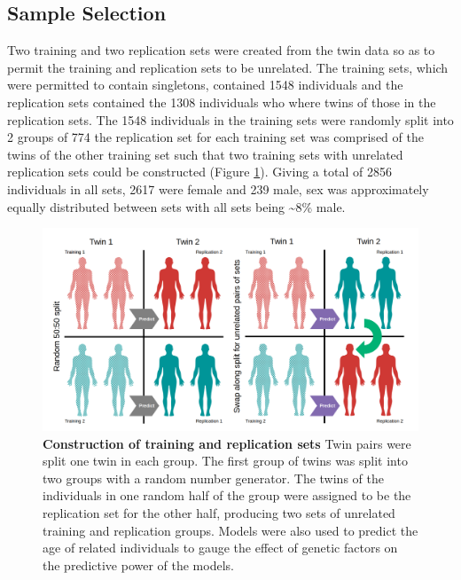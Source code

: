 \documentclass[
]{book}
\begin{document}
\hypertarget{sample-selection}{%
\subsection{Sample Selection}\label{sample-selection}}

Two training and two replication sets were created from the twin data so as to permit the training and replication sets to be unrelated.
The training sets, which were permitted to contain singletons, contained 1548 individuals and the replication sets contained the 1308 individuals who where twins of those in the replication sets.
The 1548 individuals in the training sets were randomly split into 2 groups of 774 the replication set for each training set was comprised of the twins of the other training set such that two training sets with unrelated replication sets could be constructed (Figure \ref{fig:twinsplit}).
Giving a total of 2856 individuals in all sets, 2617 were female and 239 male, sex was approximately equally distributed between sets with all sets being \textasciitilde8\% male.

\begin{figure}

{\centering \includegraphics[width=1\linewidth]{./figs/twin_split} 

}

\caption{\textbf{Construction of training and replication sets} Twin pairs were split one twin in each group. The first group of twins was split into two groups with a random number generator. The twins of the individuals in one random half of the group were assigned to be the replication set for the other half, producing two sets of unrelated training and replication groups. Models were also used to predict the age of related individuals to gauge the effect of genetic factors on the predictive power of the models.}\label{fig:twinsplit}
\end{figure}
\end{document}
